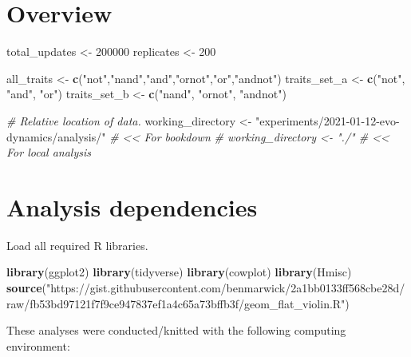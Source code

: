 \documentclass[]{book}
\newenvironment{Shaded}{\begin{snugshade}}{\end{snugshade}}
\newcommand{\CommentTok}[1]{\textcolor[rgb]{0.56,0.35,0.01}{\textit{#1}}}
\newcommand{\DecValTok}[1]{\textcolor[rgb]{0.00,0.00,0.81}{#1}}
\newcommand{\KeywordTok}[1]{\textcolor[rgb]{0.13,0.29,0.53}{\textbf{#1}}}
\newcommand{\NormalTok}[1]{#1}
\newcommand{\StringTok}[1]{\textcolor[rgb]{0.31,0.60,0.02}{#1}}
\begin{document}
\hypertarget{overview-1}{%
\section{Overview}\label{overview-1}}

\begin{Shaded}
\begin{Highlighting}[]
\NormalTok{total_updates <-}\StringTok{ }\DecValTok{200000}
\NormalTok{replicates <-}\StringTok{ }\DecValTok{200}

\NormalTok{all_traits <-}\StringTok{ }\KeywordTok{c}\NormalTok{(}\StringTok{"not"}\NormalTok{,}\StringTok{"nand"}\NormalTok{,}\StringTok{"and"}\NormalTok{,}\StringTok{"ornot"}\NormalTok{,}\StringTok{"or"}\NormalTok{,}\StringTok{"andnot"}\NormalTok{)}
\NormalTok{traits_set_a <-}\StringTok{ }\KeywordTok{c}\NormalTok{(}\StringTok{"not"}\NormalTok{, }\StringTok{"and"}\NormalTok{, }\StringTok{"or"}\NormalTok{)}
\NormalTok{traits_set_b <-}\StringTok{ }\KeywordTok{c}\NormalTok{(}\StringTok{"nand"}\NormalTok{, }\StringTok{"ornot"}\NormalTok{, }\StringTok{"andnot"}\NormalTok{)}

\CommentTok{# Relative location of data.}
\NormalTok{working_directory <-}\StringTok{ "experiments/2021-01-12-evo-dynamics/analysis/"} \CommentTok{# << For bookdown}
\CommentTok{# working_directory <- "./"                                              # << For local analysis}
\end{Highlighting}
\end{Shaded}

\hypertarget{analysis-dependencies-1}{%
\section{Analysis dependencies}\label{analysis-dependencies-1}}

Load all required R libraries.

\begin{Shaded}
\begin{Highlighting}[]
\KeywordTok{library}\NormalTok{(ggplot2)}
\KeywordTok{library}\NormalTok{(tidyverse)}
\KeywordTok{library}\NormalTok{(cowplot)}
\KeywordTok{library}\NormalTok{(Hmisc)}
\KeywordTok{source}\NormalTok{(}\StringTok{"https://gist.githubusercontent.com/benmarwick/2a1bb0133ff568cbe28d/raw/fb53bd97121f7f9ce947837ef1a4c65a73bffb3f/geom_flat_violin.R"}\NormalTok{)}
\end{Highlighting}
\end{Shaded}

These analyses were conducted/knitted with the following computing environment:
\end{document}
